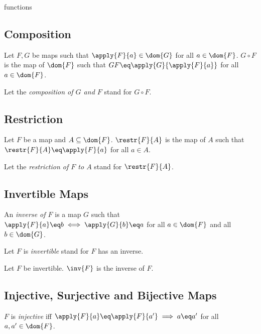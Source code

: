 \documentclass{naproche-library}
\begin{document}
\begin{smodule}{functions}
\subsection{Composition}

\begin{definition*}[forthel,id=CompositionDef,printid]
  Let $F,G$ be maps such that $\apply{F}{a}\in\dom{G}$ for all $a\in\dom{F}$.
  $G\circ F$ is the map of $\dom{F}$ such that $G\circ F\eq\apply{G}{\apply{F}{a}}$ for all $a\in\dom{F}$.

  Let the \emph{composition of $G$ and $F$} stand for $G\circ F$.
\end{definition*}


\subsection{Restriction}

\begin{definition*}[forthel,id=RestrictionDef,printid]
  Let $F$ be a map and $A\subseteq\dom{F}$.
  $\restr{F}{A}$ is the map of $A$ such that $\restr{F}{A}\eq \apply{F}{a}$ for all $a\in A$.

  Let the \emph{restriction of $F$ to $A$} stand for $\restr{F}{A}$.
\end{definition*}


\subsection{Invertible Maps}

\begin{definition*}[forthel,id=InvertibleDef,printid]
  An \emph{inverse of $F$} is a map $G$ such that $\apply{F}{a}\eq b\iff \apply{G}{b}\eq a$ for all $a\in\dom{F}$ and all $b\in\dom{G}$.

  Let $F$ is \emph{invertible} stand for $F$ has an inverse.
\end{definition*}

\begin{definition*}[forthel,id=InverseMapDef,printid]
  Let $F$ be invertible.
  $\inv{F}$ is the inverse of $F$.
\end{definition*}


\subsection{Injective, Surjective and Bijective Maps}

\begin{definition*}[forthel,id=InjectionDef,printid]
  $F$ is \emph{injective} iff $\apply{F}{a}\eq\apply{F}{a'}\implies a\eq a'$ for all $a,a'\in\dom{F}$.
\end{definition*}


\end{smodule}
\end{document}
